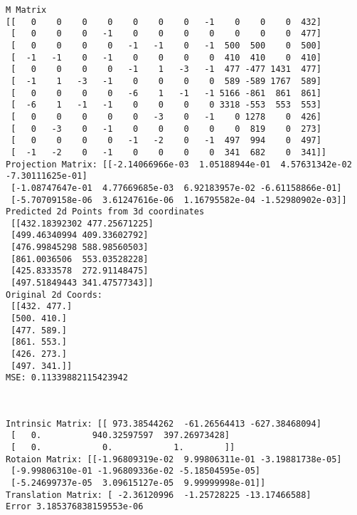 \documentclass[11pt]{article}
\begin{document}
    \begin{Verbatim}[commandchars=\\\{\}]
M Matrix
[[   0    0    0    0    0    0    0   -1    0    0    0  432]
 [   0    0    0   -1    0    0    0    0    0    0    0  477]
 [   0    0    0    0   -1   -1    0   -1  500  500    0  500]
 [  -1   -1    0   -1    0    0    0    0  410  410    0  410]
 [   0    0    0    0   -1    1   -3   -1  477 -477 1431  477]
 [  -1    1   -3   -1    0    0    0    0  589 -589 1767  589]
 [   0    0    0    0   -6    1   -1   -1 5166 -861  861  861]
 [  -6    1   -1   -1    0    0    0    0 3318 -553  553  553]
 [   0    0    0    0    0   -3    0   -1    0 1278    0  426]
 [   0   -3    0   -1    0    0    0    0    0  819    0  273]
 [   0    0    0    0   -1   -2    0   -1  497  994    0  497]
 [  -1   -2    0   -1    0    0    0    0  341  682    0  341]]
Projection Matrix: [[-2.14066966e-03  1.05188944e-01  4.57631342e-02 -7.30111625e-01]
 [-1.08747647e-01  4.77669685e-03  6.92183957e-02 -6.61158866e-01]
 [-5.70709158e-06  3.61247616e-06  1.16795582e-04 -1.52980902e-03]]
Predicted 2d Points from 3d coordinates
 [[432.18392302 477.25671225]
 [499.46340994 409.33602792]
 [476.99845298 588.98560503]
 [861.0036506  553.03528228]
 [425.8333578  272.91148475]
 [497.51849443 341.47577343]]
Original 2d Coords:
 [[432. 477.]
 [500. 410.]
 [477. 589.]
 [861. 553.]
 [426. 273.]
 [497. 341.]]
MSE: 0.11339882115423942

    \end{Verbatim}

    \begin{center}
    \end{center}
    { \hspace*{\fill} \\}
    
    \begin{Verbatim}[commandchars=\\\{\}]
Intrinsic Matrix: [[ 973.38544262  -61.26564413 -627.38468094]
 [   0.          940.32597597  397.26973428]
 [   0.            0.            1.        ]]
Rotaion Matrix: [[-1.96809319e-02  9.99806311e-01 -3.19881738e-05]
 [-9.99806310e-01 -1.96809336e-02 -5.18504595e-05]
 [-5.24699737e-05  3.09615127e-05  9.99999998e-01]]
Translation Matrix: [ -2.36120996  -1.25728225 -13.17466588]
Error 3.185376838159553e-06

    \end{Verbatim}
\end{document}
